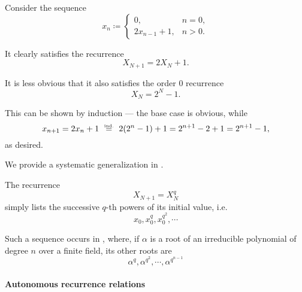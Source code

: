 \begin{example}
\begin{thmenum}
     Consider the sequence
    \begin{equation*}
      x_n \coloneqq \begin{cases}
        0,            &n = 0, \\
        2x_{n-1} + 1, &n > 0.
      \end{cases}
    \end{equation*}

    It clearly satisfies the recurrence
    \begin{equation*}
      X_{N+1} = 2X_N + 1.
    \end{equation*}

    It is less obvious that it also satisfies the order \( 0 \) recurrence
    \begin{equation*}
      X_N = 2^N - 1.
    \end{equation*}

    This can be shown by induction --- the base case is obvious, while
    \begin{equation*}
      x_{n+1}
      =
      2x_n + 1
      \reloset {\T{ind.}} =
      2(2^n - 1) + 1
      =
      2^{n+1} - 2 + 1
      =
      2^{n+1} - 1,
    \end{equation*}
    as desired.

    We provide a systematic generalization in .

     The recurrence
    \begin{equation*}
      X_{N+1} = X_N^q
    \end{equation*}
    simply lists the successive \( q \)-th powers of its initial value, i.e.
    \begin{equation*}
      x_0, x_0^q, x_0^{q^2}, \cdots
    \end{equation*}

    Such a sequence occurs in , where, if \( \alpha \) is a root of an irreducible polynomial of degree \( n \) over a finite field, its other roots are
    \begin{equation*}
      \alpha^q, \alpha^{q^2}, \cdots, \alpha^{q^{n-1}}
    \end{equation*}
  \end{thmenum}
\end{example}

\paragraph{Autonomous recurrence relations}

